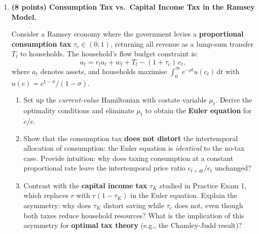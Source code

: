 \documentclass[a4paper,11pt]{article}
\newcommand{\dd}{\mathrm{d}}
\begin{document}
\begin{enumerate}[label=\textbf{\arabic*.}, leftmargin=*, itemsep=14pt]
\begin{enumerate}[label=(\alph*), itemsep=6pt]
        \item ``\textit{Standing on shoulders}'' (past knowledge raises the productivity
        of current researchers) vs.\ ``\textit{fishing out}'' (the stock of easy
        discoveries is depleted by past R\&D):  which value of $\phi$ corresponds to
        each metaphor?  What empirical evidence from patent citation studies informs
        the plausible range of $\phi$?

        \item An R\&D subsidy raises $L_A$.  In which case(s) does this permanently
        raise the \textbf{long-run growth rate} $g_M$?  In which case(s) does it affect
        only the \textbf{level} of the BGP path (transitional effect)?  State the key
        equation that distinguishes the two outcomes.
    \end{enumerate}

    \item \textbf{(8 points) Consumption Tax vs.\ Capital Income Tax in the Ramsey Model.}

    Consider a Ramsey economy where the government levies a \textbf{proportional
    consumption tax} $\tau_c \in (0,1)$, returning all revenue as a lump-sum transfer $T_t$
    to households.  The household's flow budget constraint is:
    \[
        \dot{a}_t = r_t a_t + w_t + T_t - (1+\tau_c)\,c_t,
    \]
    where $a_t$ denotes assets, and households maximise $\int_0^{\infty} e^{-\rho t}
    u(c_t)\,\dd t$ with $u(c) = c^{1-\sigma}/(1-\sigma)$.

    \begin{enumerate}[label=(\alph*), itemsep=6pt]
        \item Set up the \emph{current-value} Hamiltonian with costate variable $\mu_t$.
        Derive the optimality conditions and eliminate $\mu_t$ to obtain the
        \textbf{Euler equation} for $\dot{c}/c$.

        \item Show that the consumption tax \textbf{does not distort} the intertemporal
        allocation of consumption: the Euler equation is \emph{identical} to the no-tax
        case.  Provide intuition: why does taxing consumption at a constant proportional
        rate leave the intertemporal price ratio $c_{t+\dd t}/c_t$ unchanged?

        \item Contrast with the \textbf{capital income tax} $\tau_K$ studied in
        Practice Exam 1, which replaces $r$ with $r(1-\tau_K)$ in the Euler equation.
        Explain the asymmetry: why does $\tau_K$ distort saving while $\tau_c$ does not,
        even though both taxes reduce household resources?  What is the implication of
        this asymmetry for \textbf{optimal tax theory} (e.g., the Chamley-Judd result)?
    \end{enumerate}

\end{enumerate}
\end{document}
